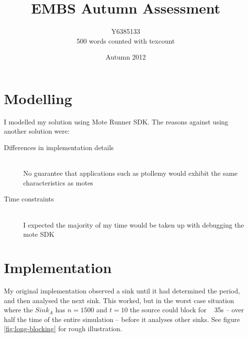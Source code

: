 \documentclass{article}
\title{EMBS Autumn Assessment}
\author{Y6385133 \\ 500 words counted with texcount}
\date{Autumn 2012}
\begin{document}
\maketitle

\section{Modelling}
I modelled my solution using Mote Runner SDK. The reasons against using another solution were:

\begin{description}
    \item[Differences in implementation details] \hfill \\
        No guarantee that applications such as ptollemy would exhibit the same characteristics as motes
    \item[Time constraints] \hfill \\
        I expected the majority of my time would be taken up with debugging the mote {SDK}
\end{description}

\section{Implementation}

My original implementation observed a sink until it had determined the period, and then analysed
the next sink. This worked, but in the worst case situation where the $Sink_A$ has $n=1500$ and $t=10$ the source could block
for ~ 35s -- over half the time of the entire simulation -- before it analyses other sinks. See figure \ref{fig:long-blocking} for rough illustration.
\end{document}
